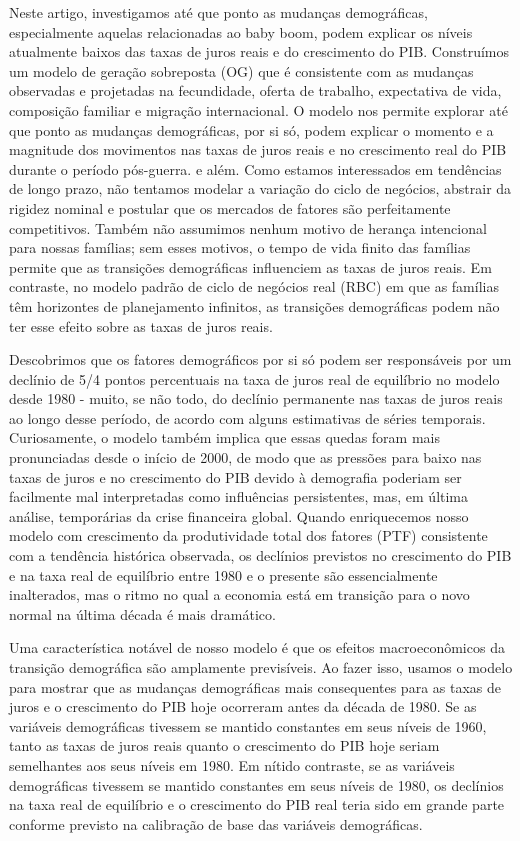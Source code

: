 Neste artigo, investigamos até que ponto as mudanças demográficas, especialmente aquelas relacionadas ao baby boom, podem explicar os níveis atualmente baixos das taxas de juros reais e do crescimento do PIB. Construímos um modelo de geração sobreposta (OG) que é consistente com as mudanças observadas e projetadas na fecundidade, oferta de trabalho, expectativa de vida, composição familiar e migração internacional. O modelo nos permite explorar até que ponto as mudanças demográficas, por si só, podem explicar o momento e a magnitude dos movimentos nas taxas de juros reais e no crescimento real do PIB durante o período pós-guerra.
e além. Como estamos interessados em tendências de longo prazo, não tentamos modelar a variação do ciclo de negócios, abstrair da rigidez nominal e postular que os mercados de fatores são perfeitamente competitivos. Também não assumimos nenhum motivo de herança intencional para nossas famílias; sem esses motivos, o tempo de vida finito das famílias permite que as transições demográficas influenciem as taxas de juros reais. Em contraste, no modelo padrão de ciclo de negócios real (RBC) em que as famílias têm horizontes de planejamento infinitos, as transições demográficas podem não ter esse efeito sobre as taxas de juros reais.

Descobrimos que os fatores demográficos por si só podem ser responsáveis por um declínio de 5/4 pontos percentuais na taxa de juros real de equilíbrio no modelo desde 1980 - muito, se não todo, do declínio permanente nas taxas de juros reais ao longo desse período, de acordo com alguns estimativas de séries temporais. Curiosamente, o modelo também implica que essas quedas foram mais pronunciadas desde o início de 2000, de modo que as pressões para baixo nas taxas de juros e no crescimento do PIB devido à demografia poderiam ser facilmente mal interpretadas como influências persistentes, mas, em última análise, temporárias da crise financeira global. Quando enriquecemos nosso modelo com crescimento da produtividade total dos fatores (PTF) consistente com a tendência histórica observada, os declínios previstos no crescimento do PIB e na taxa real de equilíbrio entre 1980 e o presente são essencialmente inalterados, mas o ritmo no qual a economia está em transição para o novo normal na última década é mais dramático.

Uma característica notável de nosso modelo é que os efeitos macroeconômicos da transição demográfica são amplamente previsíveis. Ao fazer isso, usamos o modelo para mostrar que as mudanças demográficas mais consequentes para as taxas de juros e o crescimento do PIB hoje ocorreram antes da década de 1980. Se as variáveis demográficas tivessem se mantido constantes em seus níveis de 1960, tanto as taxas de juros reais quanto o crescimento do PIB hoje seriam semelhantes aos seus níveis em 1980. Em nítido contraste, se as variáveis demográficas tivessem se mantido constantes em seus níveis de 1980, os declínios na taxa real de equilíbrio e o crescimento do PIB real teria sido em grande parte conforme previsto na calibração de base das variáveis demográficas.

